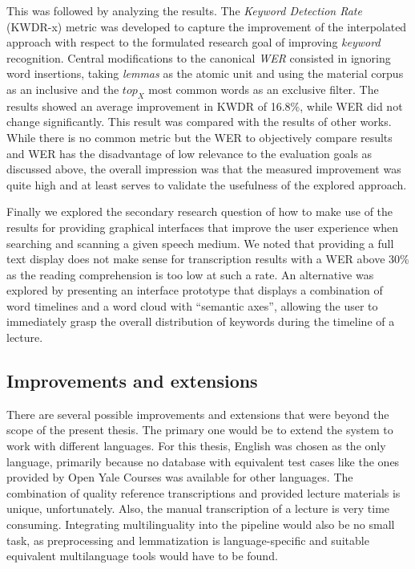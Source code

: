 \documentclass[]{article}
\begin{document}
This was followed by analyzing the results. The \emph{Keyword Detection
Rate} (KWDR-x) metric was developed to capture the improvement of the
interpolated approach with respect to the formulated research goal of
improving \emph{keyword} recognition. Central modifications to the
canonical \emph{WER} consisted in ignoring word insertions, taking
\emph{lemmas} as the atomic unit and using the material corpus as an
inclusive and the \(top_X\) most common words as an exclusive filter.
The results showed an average improvement in KWDR of 16.8\%, while WER
did not change significantly. This result was compared with the results
of other works. While there is no common metric but the WER to
objectively compare results and WER has the disadvantage of low
relevance to the evaluation goals as discussed above, the overall
impression was that the measured improvement was quite high and at least
serves to validate the usefulness of the explored approach.

Finally we explored the secondary research question of how to make use
of the results for providing graphical interfaces that improve the user
experience when searching and scanning a given speech medium. We noted
that providing a full text display does not make sense for transcription
results with a WER above 30\% as the reading comprehension is too low at
such a rate. An alternative was explored by presenting an interface
prototype that displays a combination of word timelines and a word cloud
with ``semantic axes'', allowing the user to immediately grasp the
overall distribution of keywords during the timeline of a lecture.

\subsection{Improvements and
extensions}\label{improvements-and-extensions}

There are several possible improvements and extensions that were beyond
the scope of the present thesis. The primary one would be to extend the
system to work with different languages. For this thesis, English was
chosen as the only language, primarily because no database with
equivalent test cases like the ones provided by Open Yale Courses was
available for other languages. The combination of quality reference
transcriptions and provided lecture materials is unique, unfortunately.
Also, the manual transcription of a lecture is very time consuming.
Integrating multilinguality into the pipeline would also be no small
task, as preprocessing and lemmatization is language-specific and
suitable equivalent multilanguage tools would have to be found.
\end{document}
